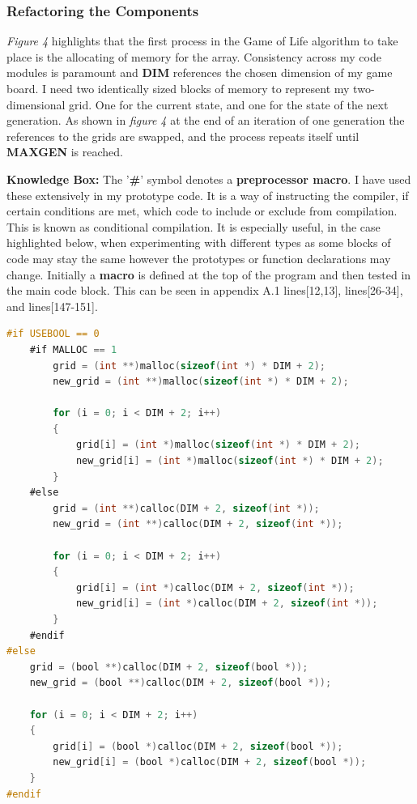 \documentclass[11pt]{article} %
\begin{document}
\subsubsection{Refactoring the Components}
{\it Figure 4} highlights that the first process in the Game of Life algorithm to take place is the allocating of memory for the array. Consistency across my code modules is paramount and {\bf DIM} references the chosen dimension of my game board. I need two identically sized blocks of memory to represent my two-dimensional grid. One for the current state, and one for the state of the next generation. As shown in {\it figure 4} at the end of an iteration of one generation the references to the grids are swapped, and the process repeats itself until {\bf MAXGEN} is reached. 
\begin{mdframed}
{\bf Knowledge Box:} The '{\bf \#}' symbol denotes a {\bf preprocessor macro}. I have used these extensively in my prototype code. It is a way of instructing the compiler, if certain conditions are met, which code to include or exclude from compilation. This is known as conditional compilation. It is especially useful, in the case highlighted below, when experimenting with different types as some blocks of code may stay the same however the prototypes or function declarations may change. Initially a {\bf macro} is defined at the top of the program and then tested in the main code block. This can be seen in appendix A.1 lines[12,13], lines[26-34], and lines[147-151].
\end{mdframed}
\begin{lstlisting}[language=C,caption={Array allocation using {\it malloc}, {\it calloc}, and {\it bool}}, morekeywords={malloc,calloc,bool}]
#if USEBOOL == 0
    #if MALLOC == 1      
        grid = (int **)malloc(sizeof(int *) * DIM + 2);
        new_grid = (int **)malloc(sizeof(int *) * DIM + 2);
        
        for (i = 0; i < DIM + 2; i++)
        {
            grid[i] = (int *)malloc(sizeof(int *) * DIM + 2);
            new_grid[i] = (int *)malloc(sizeof(int *) * DIM + 2);
        }            
    #else        
        grid = (int **)calloc(DIM + 2, sizeof(int *));
        new_grid = (int **)calloc(DIM + 2, sizeof(int *));
        
        for (i = 0; i < DIM + 2; i++)
        {
            grid[i] = (int *)calloc(DIM + 2, sizeof(int *));
            new_grid[i] = (int *)calloc(DIM + 2, sizeof(int *));
        }            
    #endif
#else
    grid = (bool **)calloc(DIM + 2, sizeof(bool *));
    new_grid = (bool **)calloc(DIM + 2, sizeof(bool *));
    
    for (i = 0; i < DIM + 2; i++)
    {
        grid[i] = (bool *)calloc(DIM + 2, sizeof(bool *));
        new_grid[i] = (bool *)calloc(DIM + 2, sizeof(bool *));
    }
#endif
\end{lstlisting}
\end{document}
